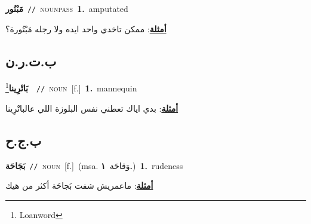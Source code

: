 \documentclass[10pt,a4paper,twoside]{article} %
\begin{document}
\begin{multicols}{2}
{\setlength\topsep{0pt}\textbf{\foreignlanguage{arabic}{مَبْتُور}}\ {\color{gray}\texttt{//}\color{black}}\ \textsc{noun\textunderscore pass}\ \textbf{1.}~amputated\  \begin{flushright}\color{gray}\foreignlanguage{arabic}{\textbf{\underline{\foreignlanguage{arabic}{أمثلة}}}: ممكن تاخدي واحد ايده ولا رجله مَبْتُورة؟}\end{flushright}\color{black}} \vspace{2mm}

\vspace{-3mm}
\subsection*{\color{blue}\foreignlanguage{arabic}{ب.ت.ر.ن}\color{blue}{ (ntws)}} 

{\setlength\topsep{0pt}\textbf{\foreignlanguage{arabic}{بَاتْرِينا}}\footnote{Loanword}\ \ {\color{gray}\texttt{//}\color{black}}\ \textsc{noun}\ [f.]\ \textbf{1.}~mannequin\  \begin{flushright}\color{gray}\foreignlanguage{arabic}{\textbf{\underline{\foreignlanguage{arabic}{أمثلة}}}: بدي اياك تعطني نفس البلوزة اللي عالباتْرِينا}\end{flushright}\color{black}} \vspace{2mm}

\vspace{-3mm}
\subsection*{\color{blue}\foreignlanguage{arabic}{ب.ج.ح}\color{blue}{}} 

{\setlength\topsep{0pt}\textbf{\foreignlanguage{arabic}{بَجَاحَة}}\ {\color{gray}\texttt{//}\color{black}}\ \textsc{noun}\ [f.]\ \color{gray}(msa. \foreignlanguage{arabic}{وَقاحَة}~\foreignlanguage{arabic}{\textbf{١.}})\color{black}\ \textbf{1.}~rudeness\  \begin{flushright}\color{gray}\foreignlanguage{arabic}{\textbf{\underline{\foreignlanguage{arabic}{أمثلة}}}: ماعمريش شفت بَجاحَة أكثر من هيك}\end{flushright}\color{black}} \vspace{2mm}


\end{multicols}
\end{document}
